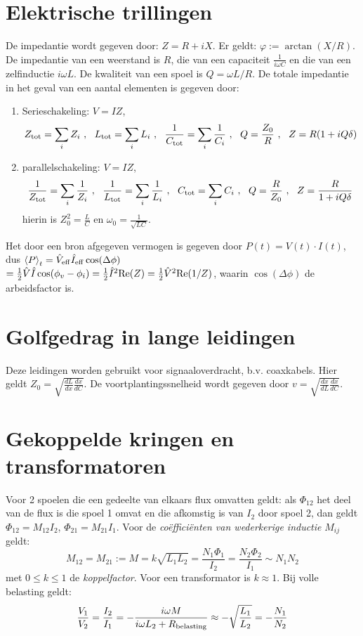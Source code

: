 \section{Elektrische trillingen}
De impedantie wordt gegeven door: $Z=R+iX$. Er geldt: $\varphi:=\arctan(X/R)$.
De impedantie van een weerstand is $R$, die van een capaciteit $\displaystyle
\frac{1}{i\omega C}$ en die van een zelfinductie $i\omega L$. De kwaliteit
van een spoel is $Q=\omega L/R$. De totale impedantie in het geval van een
aantal elementen is gegeven door:
\begin{enumerate}
\item Serieschakeling: $V=IZ$,
\[
Z_{\rm tot}=\sum_i Z_i~,~~L_{\rm tot}=\sum_i L_i~,~~
\frac{1}{C_{\rm tot}}=\sum_i\frac{1}{C_i}~,~~Q=\frac{Z_0}{R}~,~~
Z=R(1+iQ\delta)
\]
\item parallelschakeling: $V=IZ$,
\[
\frac{1}{Z_{\rm tot}}=\sum_i\frac{1}{Z_i}~,~~
\frac{1}{L_{\rm tot}}=\sum_i\frac{1}{L_i}~,~~
C_{\rm tot}=\sum_i C_i~,~~Q=\frac{R}{Z_0}~,~~
Z=\frac{R}{1+iQ\delta}
\]
hierin is $\displaystyle Z_0^2=\frac{L}{C}$ en
$\displaystyle\omega_0=\frac{1}{\sqrt{LC}}$.
\end{enumerate}
Het door een bron afgegeven vermogen is gegeven door $P(t)=V(t)\cdot I(t)$,
dus $\left\langle P \right\rangle_t=\hat{V}_{\rm eff}\hat{I}_{\rm eff}\cos(\Delta\phi)$\\
$=\mbox{$\frac{1}{2}$}\hat{V}\hat{I}\cos(\phi_v-\phi_i)=\mbox{$\frac{1}{2}$}\hat{I}^2{\rm Re}(Z)=
\mbox{$\frac{1}{2}$}\hat{V}^2{\rm Re}(1/Z)$, waarin $\cos(\Delta\phi)$ de arbeidsfactor is.

\section{Golfgedrag in lange leidingen}
Deze leidingen worden gebruikt voor signaaloverdracht, b.v. coaxkabels. Hier
geldt $\displaystyle Z_0=\sqrt{\frac{dL}{dx}\frac{dx}{dC}}$. De
voortplantingssnelheid wordt gegeven door
$\displaystyle v=\sqrt{\frac{dx}{dL}\frac{dx}{dC}}$.

\section{Gekoppelde kringen en transformatoren}
Voor 2 spoelen die een gedeelte van elkaars flux omvatten geldt: als
$\Phi_{12}$ het deel van de flux is die spoel 1 omvat en die afkomstig is van
$I_2$ door spoel 2, dan geldt $\Phi_{12}=M_{12}I_2$, $\Phi_{21}=M_{21}I_1$.
Voor de {\it co\"effici\"enten van wederkerige inductie} $M_{ij}$ geldt:
\[
M_{12}=M_{21}:=M=k\sqrt{L_1L_2}=\frac{N_1\Phi_1}{I_2}=\frac{N_2\Phi_2}{I_1}\sim N_1N_2
\]
met $0\leq k\leq1$ de {\it koppelfactor}. Voor een transformator is
$k\approx1$. Bij volle belasting geldt:
\[
\frac{V_1}{V_2}=\frac{I_2}{I_1}=-\frac{i\omega M}{i\omega L_2+R_{\rm belasting}}\approx-\sqrt{\frac{L_1}{L_2}}=-\frac{N_1}{N_2}
\]

